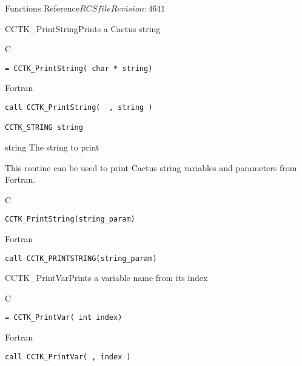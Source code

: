 \begin{cactuspart}{ Functions Reference}{$RCSfile$}{$Revision: 4641 $}
\begin{FunctionDescription}{CCTK\_PrintString}{Prints a Cactus string}
\label{CCTK-PrintString}
\begin{SynopsisSection}
\begin{Synopsis}{C}
\begin{verbatim}= CCTK_PrintString( char * string)\end{verbatim}
\end{Synopsis}
\begin{Synopsis}{Fortran}
\begin{verbatim}call CCTK_PrintString(  , string )

CCTK_STRING string\end{verbatim}
\end{Synopsis}
\end{SynopsisSection}
\begin{ParameterSection}
\begin{Parameter}{string}
The string to print
\end{Parameter}
\end{ParameterSection}
\begin{Discussion}
This routine can be used to print Cactus string variables and parameters
from Fortran.
\end{Discussion}
\begin{ExampleSection}
\begin{Example}{C}
\begin{verbatim}
CCTK_PrintString(string_param)
\end{verbatim}
\end{Example}
\begin{Example}{Fortran}
\begin{verbatim}
call CCTK_PRINTSTRING(string_param)
\end{verbatim}
\end{Example}
\end{ExampleSection}
\end{FunctionDescription}




\begin{FunctionDescription}{CCTK\_PrintVar}{Prints a variable name from its index}
\label{CCTK-PrintVar}
\begin{SynopsisSection}
\begin{Synopsis}{C}
\begin{verbatim}= CCTK_PrintVar( int index)\end{verbatim}
\end{Synopsis}
\begin{Synopsis}{Fortran}
\begin{verbatim}call CCTK_PrintVar( , index )


\end{verbatim}
\end{Synopsis}
\end{SynopsisSection}
\end{FunctionDescription}
\end{cactuspart}
